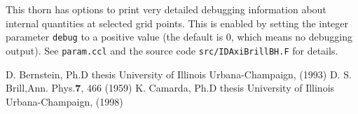 \documentclass{article}
\begin{document}
This thorn has options to print very detailed debugging information
about internal quantities at selected grid points.  This is enabled
by setting the integer parameter \verb|debug| to a positive value
(the default is $0$, which means no debugging output).  See
\verb|param.ccl| and the source code \verb|src/IDAxiBrillBH.F| for details.



\begin{thebibliography}{10}
  D. Bernstein, Ph.D thesis University of Illinois Urbana-Champaign,
  (1993)
  D. S. Brill,Ann. Phys.{\bf 7}, 466 (1959)
  K. Camarda, Ph.D thesis University of Illinois Urbana-Champaign, (1998)
\end{thebibliography}


\end{document}
